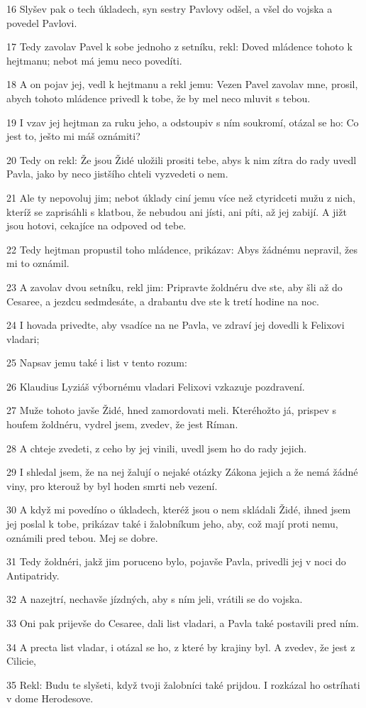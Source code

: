 \par 16 Slyšev pak o tech úkladech, syn sestry Pavlovy odšel, a všel do vojska a povedel Pavlovi.
\par 17 Tedy zavolav Pavel k sobe jednoho z setníku, rekl: Doved mládence tohoto k hejtmanu; nebot má jemu neco povedíti.
\par 18 A on pojav jej, vedl k hejtmanu a rekl jemu: Vezen Pavel zavolav mne, prosil, abych tohoto mládence privedl k tobe, že by mel neco mluvit s tebou.
\par 19 I vzav jej hejtman za ruku jeho, a odstoupiv s ním soukromí, otázal se ho: Co jest to, ješto mi máš oznámiti?
\par 20 Tedy on rekl: Že jsou Židé uložili prositi tebe, abys k nim zítra do rady uvedl Pavla, jako by neco jistšího chteli vyzvedeti o nem.
\par 21 Ale ty nepovoluj jim; nebot úklady ciní jemu více než ctyridceti mužu z nich, kteríž se zaprisáhli s klatbou, že nebudou ani jísti, ani píti, až jej zabijí. A jižt jsou hotovi, cekajíce na odpoved od tebe.
\par 22 Tedy hejtman propustil toho mládence, prikázav: Abys žádnému nepravil, žes mi to oznámil.
\par 23 A zavolav dvou setníku, rekl jim: Pripravte žoldnéru dve ste, aby šli až do Cesaree, a jezdcu sedmdesáte, a drabantu dve ste k tretí hodine na noc.
\par 24 I hovada privedte, aby vsadíce na ne Pavla, ve zdraví jej dovedli k Felixovi vladari;
\par 25 Napsav jemu také i list v tento rozum:
\par 26 Klaudius Lyziáš výbornému vladari Felixovi vzkazuje pozdravení.
\par 27 Muže tohoto javše Židé, hned zamordovati meli. Kteréhožto já, prispev s houfem žoldnéru, vydrel jsem, zvedev, že jest Ríman.
\par 28 A chteje zvedeti, z ceho by jej vinili, uvedl jsem ho do rady jejich.
\par 29 I shledal jsem, že na nej žalují o nejaké otázky Zákona jejich a že nemá žádné viny, pro kterouž by byl hoden smrti neb vezení.
\par 30 A když mi povedíno o úkladech, kteréž jsou o nem skládali Židé, ihned jsem jej poslal k tobe, prikázav také i žalobníkum jeho, aby, což mají proti nemu, oznámili pred tebou. Mej se dobre.
\par 31 Tedy žoldnéri, jakž jim poruceno bylo, pojavše Pavla, privedli jej v noci do Antipatridy.
\par 32 A nazejtrí, nechavše jízdných, aby s ním jeli, vrátili se do vojska.
\par 33 Oni pak prijevše do Cesaree, dali list vladari, a Pavla také postavili pred ním.
\par 34 A precta list vladar, i otázal se ho, z které by krajiny byl. A zvedev, že jest z Cilicie,
\par 35 Rekl: Budu te slyšeti, když tvoji žalobníci také prijdou. I rozkázal ho ostríhati v dome Herodesove.

